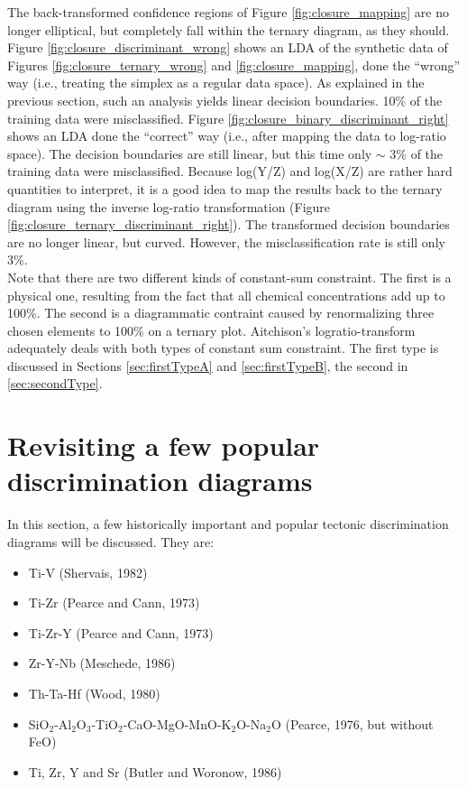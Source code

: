 \documentclass{article}
\begin{document}
The     back-transformed      confidence     regions     of     Figure
\ref{fig:closure_mapping}  are no  longer  elliptical, but  completely
fall   within   the  ternary   diagram,   as   they  should.    Figure
\ref{fig:closure_discriminant_wrong}  shows an  LDA  of the  synthetic
data      of      Figures     \ref{fig:closure_ternary_wrong}      and
\ref{fig:closure_mapping}, done the  ``wrong'' way (i.e., treating the
simplex  as a  regular  data  space).  As  explained  in the  previous
section, such  an analysis yields linear decision  boundaries. 10\% of
the      training      data      were      misclassified.       Figure
\ref{fig:closure_binary_discriminant_right}  shows  an  LDA  done  the
``correct'' way (i.e., after mapping the data to log-ratio space). The
decision boundaries are still linear, but this time only $\sim$ 3\% of
the training  data were  misclassified. Because log(Y/Z)  and log(X/Z)
are rather hard quantities to interpret,  it is a good idea to map the
results  back  to the  ternary  diagram  using  the inverse  log-ratio
transformation  (Figure \ref{fig:closure_ternary_discriminant_right}).
The transformed decision boundaries  are no longer linear, but curved.
However, the misclassification rate is still only 3\%.\\

Note   that   there   are   two  different   kinds   of   constant-sum
constraint. The first is a  physical one, resulting from the fact that
all  chemical  concentrations  add  up  to 100\%.   The  second  is  a
diagrammatic contraint  caused by renormalizing  three chosen elements
to 100\% on a ternary plot.  Aitchison's logratio-transform adequately
deals with  both types of constant  sum constraint. The  first type is
discussed  in Sections \ref{sec:firstTypeA}  and \ref{sec:firstTypeB},
the second in \ref{sec:secondType}.

\section{Revisiting a few popular discrimination diagrams}
\label{sec:revisit}

In  this section, a  few historically  important and  popular tectonic
discrimination diagrams will be discussed. They are:

\begin{itemize}
\item Ti-V (Shervais, 1982)
\item Ti-Zr (Pearce and Cann, 1973)
\item Ti-Zr-Y (Pearce and Cann, 1973)
\item Zr-Y-Nb (Meschede, 1986)
\item Th-Ta-Hf (Wood, 1980)
\item SiO$_2$-Al$_2$O$_3$-TiO$_2$-CaO-MgO-MnO-K$_2$O-Na$_2$O 
(Pearce, 1976, but without FeO)
\item Ti, Zr, Y and Sr (Butler and Woronow, 1986)
\end{itemize}
\end{document}
